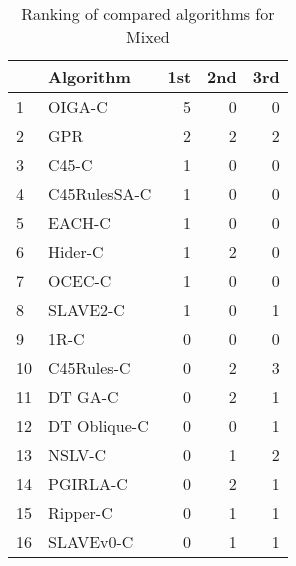 \begin{table}
\footnotesize
\caption{Ranking of compared algorithms for Mixed}
\label{tab:places Mixed}
\begin{tabular}{llrrr}
\hline
 & Algorithm & 1st & 2nd & 3rd \\
\hline
1 & OIGA-C & 5 & 0 & 0 \\
2 & GPR & 2 & 2 & 2 \\
3 & C45-C & 1 & 0 & 0 \\
4 & C45RulesSA-C & 1 & 0 & 0 \\
5 & EACH-C & 1 & 0 & 0 \\
6 & Hider-C & 1 & 2 & 0 \\
7 & OCEC-C & 1 & 0 & 0 \\
8 & SLAVE2-C & 1 & 0 & 1 \\
9 & 1R-C & 0 & 0 & 0 \\
10 & C45Rules-C & 0 & 2 & 3 \\
11 & DT GA-C & 0 & 2 & 1 \\
12 & DT Oblique-C & 0 & 0 & 1 \\
13 & NSLV-C & 0 & 1 & 2 \\
14 & PGIRLA-C & 0 & 2 & 1 \\
15 & Ripper-C & 0 & 1 & 1 \\
16 & SLAVEv0-C & 0 & 1 & 1 \\
\hline
\end{tabular}
\end{table}
